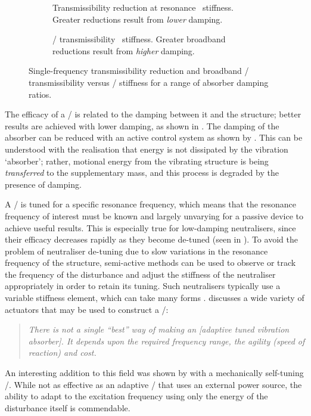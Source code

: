 \documentclass[11pt,a4paper]{memoir}
\begin{document}
\begin{figure}
\begin{wide}
  \begin{subfigure}[0.44]
    \caption{
      Transmissibility reduction at resonance \vs\ stiffness.
      Greater reductions result from \emph{lower} damping.}
  \end{subfigure}
  \qquad
  \begin{subfigure}[0.44]
    \caption{
      \expandafter\MakeUppercase\RMS/ transmissibility \vs\ stiffness.
      Greater broadband reductions result from \emph{higher} damping.}
  \end{subfigure}
\end{wide}
\caption[Single-frequency transmissibility reduction and broadband \RMS/ transmissibility versus \vibneut/ stiffness.]{
  Single-frequency transmissibility reduction and broadband \RMS/ transmissibility versus \vibneut/ stiffness for a range of absorber damping ratios.
}
\end{figure}

The efficacy of a \vibneut/ is related to the damping between it and the structure; better results are achieved with lower damping, as shown in .
The damping of the absorber can be reduced with an active control system as shown by \textcite{kidner1998}.
This can be understood with the realisation that energy is not dissipated by the vibration `absorber'; rather, motional energy from the vibrating structure is being \emph{transferred} to the supplementary mass, and this process is degraded by the presence of damping.

A \vibneut/ is tuned for a specific resonance frequency, which means that the resonance frequency of interest must be known and largely unvarying for a passive device to achieve useful results.
This is especially true for low-damping neutralisers, since their efficacy decreases rapidly as they become de-tuned (seen in ).
To avoid the problem of neutraliser de-tuning due to slow variations in the resonance frequency of the structure, semi-active methods can be used to observe or track the frequency of the disturbance and adjust the stiffness of the neutraliser appropriately in order to retain its tuning.
Such neutralisers typically use a variable stiffness element, which can take many forms \cite{ting-kong1999,kidner2002,holdhusen2007}.
\textcite{brennan2006} discusses a wide variety of actuators that may be used to construct a \vibneut/:
\begin{quote}\itshape
There is not a single ``best'' way of making an \textup[adaptive tuned vibration absorber\textup].
It depends upon the required frequency range, the agility (speed of reaction) and cost.
\end{quote}
An interesting addition to this field was shown by
\textcite{ivers2008} with a mechanically self-tuning \vibneut/.
While not as effective as an adaptive \vibneut/ that uses an external power source, the ability to adapt to the excitation frequency using only the energy of the disturbance itself is commendable.
\end{document}
